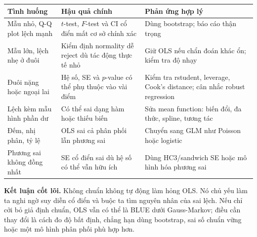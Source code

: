 \begin{center}
\small
\begin{tabularx}{\textwidth}{@{}>{\raggedright\arraybackslash}p{3.0cm}>{\raggedright\arraybackslash}X>{\raggedright\arraybackslash}X@{}}
\toprule
\textbf{Tình huống} & \textbf{Hậu quả chính} & \textbf{Phản ứng hợp lý} \\
\midrule
Mẫu nhỏ, Q-Q plot lệch mạnh & $t$-test, $F$-test và CI cổ điển mất cơ sở chính xác & Dùng bootstrap; báo cáo thận trọng \\
Mẫu lớn, lệch nhẹ ở đuôi & Kiểm định normality dễ reject dù tác động thực tế nhỏ & Giữ OLS nếu chẩn đoán khác ổn; kiểm tra độ nhạy \\
Đuôi nặng hoặc ngoại lai & Hệ số, SE và $p$-value có thể phụ thuộc vào vài điểm & Kiểm tra rstudent, leverage, Cook's distance; cân nhắc robust regression \\
Lệch kèm mẫu hình phần dư & Có thể sai dạng hàm hoặc thiếu biến & Sửa mean function: biến đổi, đa thức, spline, tương tác \\
Đếm, nhị phân, tỷ lệ & OLS sai cả phân phối lẫn phương sai & Chuyển sang GLM như Poisson hoặc logistic \\
Phương sai không đồng nhất & SE cổ điển sai dù hệ số có thể vẫn hữu ích & Dùng HC3/sandwich SE hoặc mô hình hóa phương sai \\
\bottomrule
\end{tabularx}
\end{center}

\begin{notebox}
\textbf{Kết luận cốt lõi.} Không chuẩn không tự động làm hỏng OLS. Nó chủ yếu làm ta nghi ngờ suy diễn cổ điển và buộc ta tìm nguyên nhân của sai lệch. Nếu chỉ cởi bỏ giả định chuẩn, OLS vẫn có thể là BLUE dưới Gauss-Markov; điều cần thay đổi là cách đo độ bất định, chẳng hạn dùng bootstrap, sai số chuẩn vững hoặc một mô hình phân phối phù hợp hơn.
\end{notebox}

